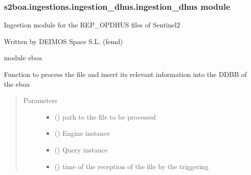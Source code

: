 \subsubsection{s2boa.ingestions.ingestion\_dhus.ingestion\_dhus module}
\label{\detokenize{s2boa.ingestions:module-s2boa.ingestions.ingestion_dhus.ingestion_dhus}}\label{\detokenize{s2boa.ingestions:s2boa-ingestions-ingestion-dhus-ingestion-dhus-module}}
\sphinxAtStartPar
Ingestion module for the REP\_OPDHUS files of Sentinel\sphinxhyphen{}2

\sphinxAtStartPar
Written by DEIMOS Space S.L. (femd)

\sphinxAtStartPar
module eboa

\begin{fulllineitems}
\label{\detokenize{s2boa.ingestions:s2boa.ingestions.ingestion_dhus.ingestion_dhus.process_file}}
\sphinxAtStartPar
Function to process the file and insert its relevant information
into the DDBB of the eboa
\begin{quote}\begin{description}
\item[{Parameters}] \leavevmode\begin{itemize}
\item {} 
\sphinxAtStartPar
{} () \textendash{} path to the file to be processed

\item {} 
\sphinxAtStartPar
{} () \textendash{} Engine instance

\item {} 
\sphinxAtStartPar
{} () \textendash{} Query instance

\item {} 
\sphinxAtStartPar
{} () \textendash{} time of the reception of the file by the triggering

\end{itemize}

\end{description}\end{quote}

\end{fulllineitems}



